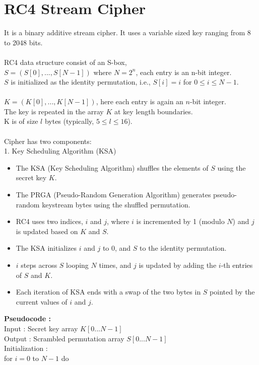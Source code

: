 \documentclass[11pt]{article}
\begin{document}
\section*{RC4 Stream Cipher}
It is a binary additive stream cipher. It uses a variable sized key ranging from 8 to 2048 bits.\\
\\
RC4 data structure consist of an S-box,\\
$S = (S[0],...,S[N-1])$ \hspace{3cm}where $N = 2^{n}$, each entry is an n-bit integer.\\
$S$ is initialized as the identity permutation, i.e., $S[i] = i$ for $0 \leq i \leq N-1$. \\\\
$K = (K[0],...,K[N-1])$, here each entry is again an $n$-bit integer. \\
The key is repeated in the array $K$ at key length boundaries. \\
K is of size $l$ bytes (typically, $5 \leq l \leq 16$).\\\\
Cipher has two components: \\
1. Key Scheduling Algorithm (KSA) 
\begin{itemize}
\itemsep 0em
\item The KSA (Key Scheduling Algorithm) shuffles the elements of $S$ using the secret key $K$.
\item The PRGA (Pseudo-Random Generation Algorithm) generates pseudo-random keystream bytes using the shuffled permutation.
\item RC4 uses two indices, $i$ and $j$, where $i$ is incremented by 1 (modulo $N$) and $j$ is updated based on $K$ and $S$.
\item The KSA initializes $i$ and $j$ to 0, and $S$ to the identity permutation.
\item $i$ steps across $S$ looping $N$ times, and $j$ is updated by adding the $i$-th entries of $S$ and $K$.
\item Each iteration of KSA ends with a swap of the two bytes in $S$ pointed by the current values of $i$ and $j$.
\end{itemize}
\textbf{Pseudocode :}\\
Input : Secret key array $K[0...N-1]$ \\
Output : Scrambled permutation array $S[0...N-1]$\\
Initialization : \\
for $i=0$ to $N-1$ do \\
\end{document}
